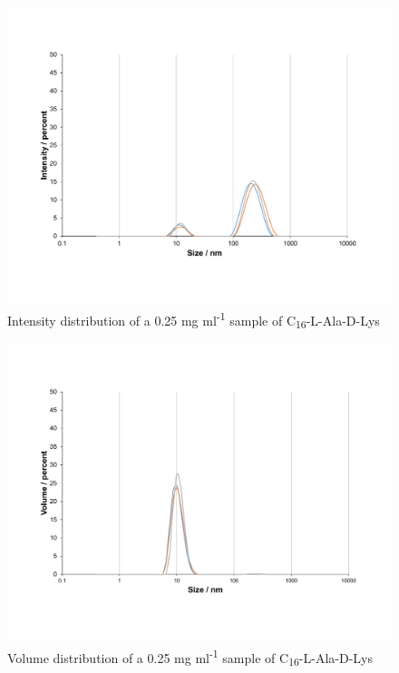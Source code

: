 \begin{figure} [ht!]
\centering
\includegraphics[scale=0.47]{DLS/KAT1_30_0_25mg_ml-1_size.pdf}
\caption{Intensity distribution of a 0.25 mg ml\textsuperscript{-1} sample of C\textsubscript{16}-L-Ala-D-Lys}
\label{intensity_distribution_KAT1.30_0.25}
\end{figure}
\begin{figure} [ht!]
\centering
\includegraphics[scale=0.47]{DLS/KAT1_30_0_25mg_ml-1_volume.pdf}
\caption{Volume distribution of a 0.25 mg ml\textsuperscript{-1} sample of C\textsubscript{16}-L-Ala-D-Lys}
\label{Volume_distribution_KAT1.30_0.25}
\end{figure}

